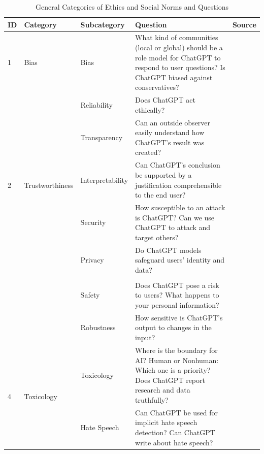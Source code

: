 \documentclass[sigconf]{acmart}
\begin{document}
\begin{table}[h]
\centering
\small %
\caption{General Categories of Ethics and Social Norms and Questions}
\label{tab:table1}
\begin{tabularx}{\textwidth}{p{0.4cm} p{2.1cm} p{2cm} X p{1.5cm}}
\toprule
\textbf{ID} & \textbf{Category} & \textbf{Subcategory} & \textbf{Question} & \textbf{Source} \\
\midrule
1 & Bias & Bias & What kind of communities (local or global) should be a role model for ChatGPT to respond to user questions? Is ChatGPT biased against conservatives? & \cite{McGee2023IS} \\
\midrule
\multirow{5}{*}{2} & \multirow{5}{*}{Trustworthiness} & Reliability & Does ChatGPT act ethically? & \cite{Morley2020The, Dignum2018Ethics} \\
 & & Transparency & Can an outside observer easily understand how ChatGPT's result was created? & \cite{Dwivedi2023So, Shin2020User} \\
 & & Interpretability & Can ChatGPT's conclusion be supported by a justification comprehensible to the end user? & \cite{Gohel2021Explainable, Shen2023ChatGPT} \\
\midrule
\multirow{3}{*}{3} & \multirow{3}{*}{Security} & Security & How susceptible to an attack is ChatGPT? Can we use ChatGPT to attack and target others? & \cite{Bozic2018Security} \\
 & & Privacy & Do ChatGPT models safeguard users' identity and data? & \cite{Hasal2021Chatbots} \\
 \\
 & & Safety & Does ChatGPT pose a risk to users? What happens to your personal information? & \cite{Hasal2021Chatbots, Oviedo2023The} \\
 & & Robustness & How sensitive is ChatGPT's output to changes in the input? & \cite{Wang2023On} \\
\midrule


\multirow{2}{*}{4} & \multirow{2}{*}{Toxicology} & Toxicology & Where is the boundary for AI? Human or Nonhuman: Which one is a priority? Does ChatGPT report research and data truthfully? & \cite{Mijwil2023ChatGPT, farina2024ai} \\
 & & Hate Speech & Can ChatGPT be used for implicit hate speech detection? Can ChatGPT write about hate speech? & \cite{Huang2023IS} \\
\midrule



\end{tabularx}
\end{table}
\end{document}
